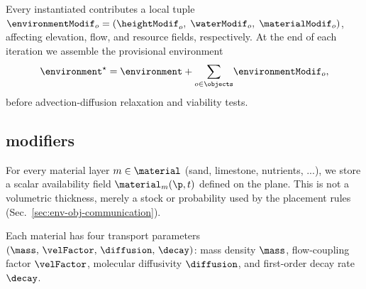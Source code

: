 

\section{}
\label{sec:env-obj-materials}

Every instantiated  contributes a local  tuple $\environmentModif_o=(\heightModif_o,\;\waterModif_o,\;\materialModif_o)$, affecting elevation, flow, and resource fields, respectively. At the end of each iteration we assemble the provisional environment
\begin{align}
  \environment^{\star} = \environment + {\sum_{o\in\objects}}\environmentModif_o,
\end{align}
before advection-diffusion relaxation and viability tests.

\subsection{ modifiers}
For every material layer $m \in \material$ (sand, limestone, nutrients, ...), we store a scalar availability field $\material_m(\p,t)$ defined on the plane. This is not a volumetric thickness, merely a stock or probability used by the placement rules (Sec.~\ref{sec:env-obj-communication}).

Each material has four transport parameters $(\mass,\,\velFactor,\,\diffusion,\,\decay)$: mass density $\mass$, flow-coupling factor $\velFactor$, molecular diffusivity $\diffusion$, and first-order decay rate $\decay$.


